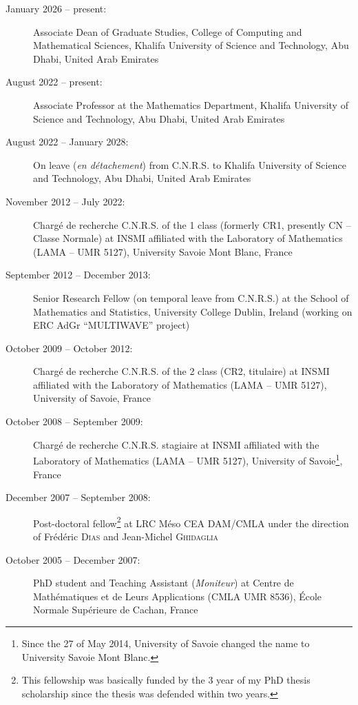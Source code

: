 \documentclass[final, a4paper, oneside, 12pt]{article}
\numberwithin{equation}{section}
\begin{document}
\begin{description}

  \item[January 2026 -- present:] Associate Dean of Graduate Studies, College of Computing and Mathematical Sciences, Khalifa University of Science and Technology, Abu Dhabi, United Arab Emirates

  \item[August 2022 -- present:] Associate Professor at the Mathematics Department, Khalifa University of Science and Technology, Abu Dhabi, United Arab Emirates

  \item[August 2022 -- January 2028:] On leave (\textit{en d\'etachement}) from C.N.R.S. to Khalifa University of Science and Technology, Abu Dhabi, United Arab Emirates

  \item[November 2012 -- July 2022:] Charg\'e de recherche C.N.R.S. of the 1 class (formerly CR1, presently CN -- Classe Normale) at INSMI affiliated with the Laboratory of Mathematics (LAMA -- UMR 5127), University Savoie Mont Blanc, France

  
  \item[September 2012 -- December 2013:] Senior Research Fellow (on temporal leave from C.N.R.S.) at the School of Mathematics and Statistics, University College Dublin, Ireland (working on ERC AdGr ``MULTIWAVE'' project)
    
  \item[October 2009 -- October 2012:] Charg\'e de recherche C.N.R.S. of the 2 class (CR2, titulaire) at INSMI affiliated with the Laboratory of Mathematics (LAMA -- UMR 5127), University of Savoie, France
  
  \item[October 2008 -- September 2009:] Charg\'e de recherche C.N.R.S. stagiaire at INSMI affiliated with the Laboratory of Mathematics (LAMA -- UMR 5127), University of Savoie\footnote{Since the 27 of May 2014, University of Savoie changed the name to University Savoie Mont Blanc.\label{fn:usmb}}, France
  
  \item[December 2007 -- September 2008:] Post-doctoral fellow\footnote{This fellowship was basically funded by the 3 year of my PhD thesis scholarship since the thesis was defended within two years.} at LRC M\'eso CEA DAM/CMLA under the direction of Fr\'ed\'eric \textsc{Dias} and Jean-Michel \textsc{Ghidaglia}
  
  \item[October 2005 -- December 2007:] PhD student and Teaching Assistant (\emph{Moniteur}) at Centre de Math\'ematiques et de Leurs Applications (CMLA UMR 8536), \'Ecole Normale Sup\'erieure de Cachan, France
  
\end{description}
\end{document}

